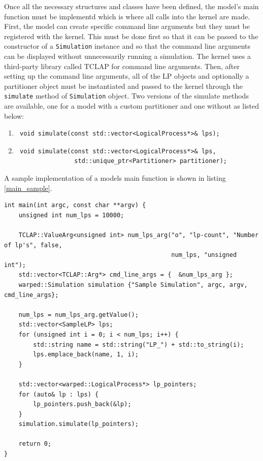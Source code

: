 \documentclass[11pt]{book}
\begin{document}
Once all the necessary structures and classes have been defined, the model's main function
must be implementd which is where all calls into the kernel are made. First, the model can create
specific command line arguments but they must be registered with the kernel. This must be done
first so that it can be passed to the constructor of a \texttt{Simulation} instance and so that
the command line arguments can be displayed without unnecessarily running a simulation. The
kernel uses a third-party library called TCLAP for command line arguments. Then, after setting
up the command line arguments, all of the LP objects and optionally a partitioner object must
be instantiated and passed to the kernel through the \texttt{simulate} method of
\texttt{Simulation} object. Two versions of the simulate methods are available, one for a model
with a custom partitioner and one without as listed below:

\begin{enumerate}
    \item \begin{verbatim} void simulate(const std::vector<LogicalProcess*>& lps); \end{verbatim}
    \item \begin{verbatim} void simulate(const std::vector<LogicalProcess*>& lps,
                std::unique_ptr<Partitioner> partitioner); \end{verbatim}
\end{enumerate}

\noindent
A sample implementation of a models main function is shown in listing \ref{main_sample}.

\begin{lstlisting}[caption=Sample \textsc{warped2} Main Definition, label=main_sample, float]
int main(int argc, const char **argv) {
    unsigned int num_lps = 10000;

    TCLAP::ValueArg<unsigned int> num_lps_arg("o", "lp-count", "Number of lp's", false,
                                              num_lps, "unsigned int");
    std::vector<TCLAP::Arg*> cmd_line_args = {  &num_lps_arg };
    warped::Simulation simulation {"Sample Simulation", argc, argv, cmd_line_args};

    num_lps = num_lps_arg.getValue();
    std::vector<SampleLP> lps;
    for (unsigned int i = 0; i < num_lps; i++) {
        std::string name = std::string("LP_") + std::to_string(i);
        lps.emplace_back(name, 1, i);
    }

    std::vector<warped::LogicalProcess*> lp_pointers;
    for (auto& lp : lps) {
        lp_pointers.push_back(&lp);
    }
    simulation.simulate(lp_pointers);

    return 0;
}
\end{lstlisting}
\end{document}
